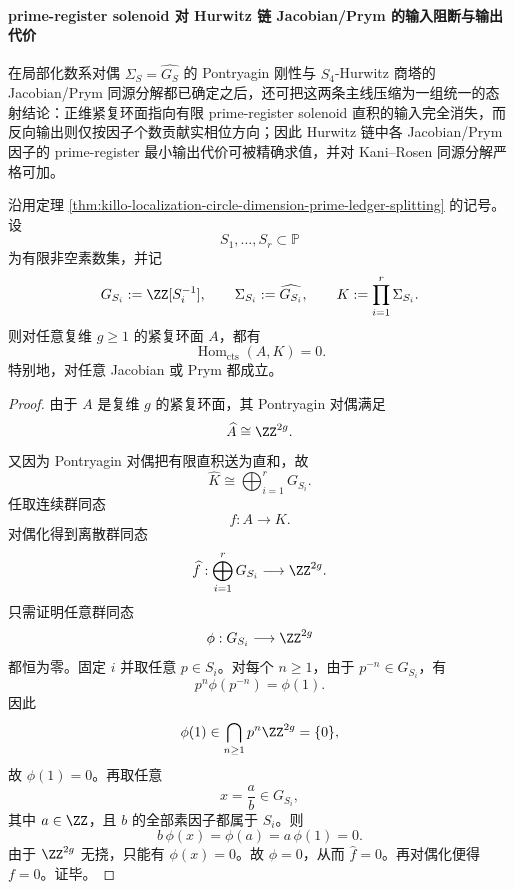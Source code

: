\paragraph{prime-register solenoid 对 Hurwitz 链 Jacobian/Prym 的输入阻断与输出代价}
在局部化数系对偶 \(\Sigma_S=\widehat{G_S}\) 的 Pontryagin 刚性与 \(S_4\)-Hurwitz 商塔的 Jacobian/Prym 同源分解都已确定之后，还可把这两条主线压缩为一组统一的态射结论：正维紧复环面指向有限 prime-register solenoid 直积的输入完全消失，而反向输出则仅按因子个数贡献实相位方向；因此 Hurwitz 链中各 Jacobian/Prym 因子的 prime-register 最小输出代价可被精确求值，并对 Kani--Rosen 同源分解严格可加。

\begin{theorem}\label{thm:xi-time-part9n1d-prime-register-input-obstruction}
沿用定理 \ref{thm:killo-localization-circle-dimension-prime-ledger-splitting} 的记号。设
\[
S_1,\dots,S_r\subset \mathbb P
\]
为有限非空素数集，并记
\[
G_{S_i}:=\ZZ[S_i^{-1}],
\qquad
\Sigma_{S_i}:=\widehat{G_{S_i}},
\qquad
K:=\prod_{i=1}^r \Sigma_{S_i}.
\]
则对任意复维 \(g\ge 1\) 的紧复环面 \(A\)，都有
\[
\boxed{\;
\operatorname{Hom}_{\mathrm{cts}}(A,K)=0.\;}
\]
特别地，对任意 Jacobian 或 Prym 都成立。
\end{theorem}
\begin{proof}
由于 \(A\) 是复维 \(g\) 的紧复环面，其 Pontryagin 对偶满足
\[
\widehat A\cong \ZZ^{2g}.
\]
又因为 Pontryagin 对偶把有限直积送为直和，故
\[
\widehat K\cong \bigoplus_{i=1}^r G_{S_i}.
\]
任取连续群同态
\[
f:A\longrightarrow K.
\]
对偶化得到离散群同态
\[
\widehat f:\bigoplus_{i=1}^r G_{S_i}\longrightarrow \ZZ^{2g}.
\]
只需证明任意群同态
\[
\phi:G_{S_i}\longrightarrow \ZZ^{2g}
\]
都恒为零。固定 \(i\) 并取任意 \(p\in S_i\)。对每个 \(n\ge 1\)，由于 \(p^{-n}\in G_{S_i}\)，有
\[
p^n\phi(p^{-n})=\phi(1).
\]
因此
\[
\phi(1)\in \bigcap_{n\ge 1}p^n\ZZ^{2g}=\{0\},
\]
故 \(\phi(1)=0\)。再取任意
\[
x=\frac{a}{b}\in G_{S_i},
\]
其中 \(a\in \ZZ\)，且 \(b\) 的全部素因子都属于 \(S_i\)。则
\[
b\,\phi(x)=\phi(a)=a\,\phi(1)=0.
\]
由于 \(\ZZ^{2g}\) 无挠，只能有 \(\phi(x)=0\)。故 \(\phi=0\)，从而 \(\widehat f=0\)。再对偶化便得 \(f=0\)。证毕。
\end{proof}

